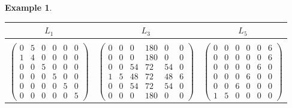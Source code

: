 \documentclass[11pt]{amsart}
\newcommand{\pmat}[1]{\begin{pmatrix} #1 \end{pmatrix}}
\theoremstyle{plain} %
\theoremstyle{definition} %
\newtheorem{ex}[thm]{Example} %
\theoremstyle{remark} %
\begin{document}
\begin{ex}
\begin{table}[H]
\begin{center}
\begin{tabular}{ccc}
$L_1$&$L_3$&$L_5$\\
\hline%
\\
$\pmat{0 & 5 & 0 & 0 & 0 & 0 \\
1 & 4 & 0 & 0 & 0 & 0 \\
0 & 0 & 5 & 0 & 0 & 0 \\
0 & 0 & 0 & 5 & 0 & 0 \\
0 & 0 & 0 & 0 & 5 & 0 \\
0 & 0 & 0 & 0 & 0 & 5}$
&$\pmat{0 & 0 & 0 & 180 & 0 & 0 \\
0 & 0 & 0 & 180 & 0 & 0 \\
0 & 0 & 54 & 72 & 54 & 0 \\
1 & 5 & 48 & 72 & 48 & 6 \\
0 & 0 & 54 & 72 & 54 & 0 \\
0 & 0 & 0 & 180 & 0 & 0}$
&$\pmat{0 & 0 & 0 & 0 & 0 & 6 \\
0 & 0 & 0 & 0 & 0 & 6 \\
0 & 0 & 0 & 0 & 6 & 0 \\
0 & 0 & 0 & 6 & 0 & 0 \\
0 & 0 & 6 & 0 & 0 & 0 \\
1 & 5 & 0 & 0 & 0 & 0}$
      \end{tabular}
  \end{center}
\end{table}


\end{ex}
\end{document}
